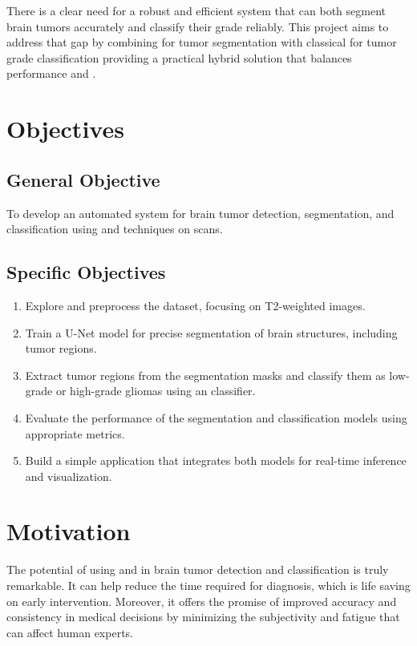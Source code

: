 There is a clear need for a robust and efficient system that can both segment brain tumors accurately and classify their grade reliably. This project aims to address that gap by combining  for tumor segmentation with classical  for tumor grade classification providing a practical hybrid solution that balances performance and .

\section{Objectives}
\subsection{General Objective}

To develop an automated system for brain tumor detection, segmentation, and classification using  and  techniques on  scans.

\subsection{Specific Objectives}

\begin{enumerate}
	\item Explore and preprocess the  dataset, focusing on T2-weighted  images.
	\item Train a U-Net model for precise segmentation of brain structures, including tumor regions.
	\item Extract tumor regions from the segmentation masks and classify them as low-grade or high-grade gliomas using an  classifier.
	\item Evaluate the performance of the segmentation and classification models using appropriate metrics.
	\item Build a simple application that integrates both models for real-time inference and visualization.
\end{enumerate}

\section{ Motivation }

The potential of using  and  in brain tumor detection and classification is truly remarkable. It can help reduce the time required for diagnosis, which is life saving on  early intervention. Moreover, it offers the promise of improved accuracy and consistency in medical decisions by minimizing the subjectivity and fatigue that can affect human experts.

